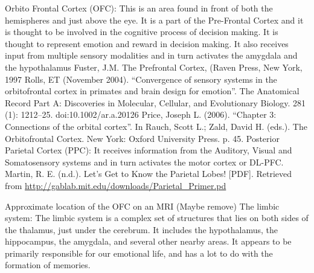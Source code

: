 \documentclass{article}
\begin{document}
Orbito Frontal Cortex (OFC): This is an area found in front of both the hemispheres and just above the eye. It is a part of the Pre-Frontal Cortex and it is thought to be involved in the cognitive process of decision making. It is thought to represent emotion and reward in decision making. It also receives input from multiple sensory modalities and in turn activates the amygdala and the hypothalamus
Fuster, J.M. The Prefrontal Cortex, (Raven Press, New York, 1997
Rolls, ET (November 2004). “Convergence of sensory systems in the orbitofrontal cortex in primates and brain design for emotion”. The Anatomical Record Part A: Discoveries in Molecular, Cellular, and Evolutionary Biology. 281 (1): 1212–25. doi:10.1002/ar.a.20126
Price, Joseph L. (2006). “Chapter 3: Connections of the orbital cortex”. In Rauch, Scott L.; Zald, David H. (eds.). The Orbitofrontal Cortex. New York: Oxford University Press. p. 45.
Posterior Parietal Cortex (PPC): It receives information from the Auditory, Visual and Somatosensory systems and in turn activates the motor cortex or DL-PFC.
Martin, R. E. (n.d.). Let’s Get to Know the Parietal Lobes! [PDF]. Retrieved from \url{http://gablab.mit.edu/downloads/Parietal_Primer.pd}

Approximate location of the OFC on an MRI
(Maybe remove)
The limbic system: The limbic system is a complex set of structures that lies on both sides of the thalamus, just under the cerebrum. It includes the hypothalamus, the hippocampus, the amygdala, and several other nearby areas. It appears to be primarily responsible for our emotional life, and has a lot to do with the formation of memories.
\end{document}
